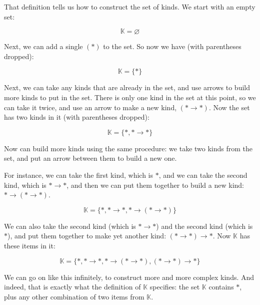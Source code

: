 \documentclass{book}
\numberwithin{equation}{chapter}
\begin{document}
\noindent
That definition tells us how to construct the set of kinds. We start with an empty set:

\begin{equation}
\mathbb{K} = \varnothing
\end{equation}

\noindent
Next, we can add a single $(\ast)$ to the set. So now we have (with parentheses dropped):

\begin{equation}
\mathbb{K} = \{ \ast \}
\end{equation}

\noindent
Next, we can take any kinds that are already in the set, and use arrows to build more kinds to put in the set. There is only one kind in the set at this point, so we can take it twice, and use an arrow to make a new kind, $(\ast \rightarrow \ast)$. Now the set has two kinds in it (with parentheses dropped):

\begin{equation}
\mathbb{K} = \{ \ast, \ast \rightarrow \ast \}
\end{equation}

\noindent
Now can build more kinds using the same procedure: we take two kinds from the set, and put an arrow between them to build a new one. 

For instance, we can take the first kind, which is $\ast$, and we can take the second kind, which is $\ast \rightarrow \ast$, and then we can put them together to build a new kind: $\ast \rightarrow (\ast \rightarrow \ast)$.

\begin{equation}
\mathbb{K} = \{ \ast, \ast \rightarrow \ast, \ast \rightarrow (\ast \rightarrow \ast) \}
\end{equation}

\noindent
We can also take the second kind (which is $\ast \rightarrow \ast$) and the second kind (which is $\ast$), and put them together to make yet another kind: $(\ast \rightarrow \ast) \rightarrow \ast$. Now $\mathbb{K}$ has these items in it:

\begin{equation}
\mathbb{K} = \{ \ast, \ast \rightarrow \ast, \ast \rightarrow (\ast \rightarrow \ast), (\ast \rightarrow \ast) \rightarrow \ast \}
\end{equation}

\noindent
We can go on like this infinitely, to construct more and more complex kinds. And indeed, that is exactly what the definition of $\mathbb{K}$ specifies: the set $\mathbb{K}$ contains $\ast$, plus any other combination of two items from $\mathbb{K}$.
\end{document}
